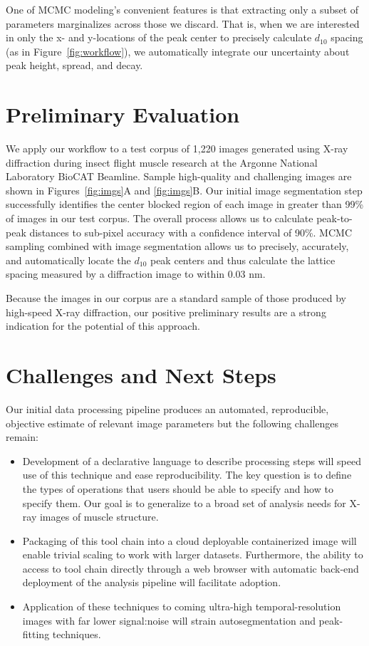 \documentclass{llncs}
\begin{document}
One of MCMC modeling's convenient features is that extracting only a
subset of parameters marginalizes across those we discard. That is,
when we are interested in only the x- and y-locations of the peak
center to precisely calculate $d_{10}$ spacing (as in
Figure~\ref{fig:workflow}), we automatically integrate our uncertainty
about peak height, spread, and decay.


\section{Preliminary Evaluation}
\label{sec:eval}

We apply our workflow to a test corpus of 1,220 images generated using
X-ray diffraction during insect flight muscle research at the Argonne
National Laboratory BioCAT Beamline. Sample high-quality and
challenging images are shown in Figures~\ref{fig:imgs}A and
\ref{fig:imgs}B.  Our initial image segmentation step successfully
identifies the center blocked region of each image in greater than
99\% of images in our test corpus. The overall process allows us to
calculate peak-to-peak distances to sub-pixel accuracy with a
confidence interval of 90\%. MCMC sampling combined with image
segmentation allows us to precisely, accurately, and automatically
locate the $d_{10}$ peak centers and thus calculate the lattice
spacing measured by a diffraction image to within 0.03 nm.

Because the images in our corpus are a standard sample of those
produced by high-speed X-ray diffraction, our positive preliminary
results are a strong indication for the potential of this approach.


\section{Challenges and Next Steps}
\label{sec:challenges}

Our initial data processing pipeline produces an automated,
reproducible, objective estimate of relevant image parameters but the
following challenges remain:

\begin{itemize}
\item Development of a declarative language to describe processing
    steps will speed use of this technique and ease reproducibility.
    The key question is to define the types of operations that users
    should be able to specify and how to specify them. Our goal is to
    generalize to a broad set of analysis needs for X-ray images of
    muscle structure.
\item Packaging of this tool chain into a cloud deployable
    containerized image will enable trivial scaling to work with
    larger datasets. Furthermore, the ability to access to tool chain
    directly through a web browser with automatic back-end deployment
    of the analysis pipeline will facilitate adoption. 
\item Application of these techniques to coming ultra-high
    temporal-resolution images with far lower signal:noise will strain
    autosegmentation and peak-fitting techniques. 
\end{itemize}
\end{document}
